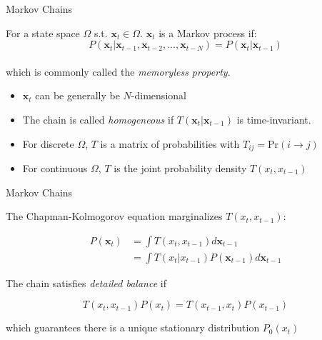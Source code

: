 \documentclass{beamer}					%
\begin{document}
\begin{frame}{Markov Chains}

For a state space $\Omega$ s.t. $\mathbf{x}_t\in \Omega$. $\mathbf{x}_t$ is a Markov process if:\\
\vspace{0.1in}
\begin{equation*}
P(\mathbf{x}_{t}|\mathbf{x}_{t-1},\mathbf{x}_{t-2},...,\mathbf{x}_{t-N}) = P(\mathbf{x}_{t}|\mathbf{x}_{t-1})
\end{equation*}
\\
\vspace{0.1in}
which is commonly called the \emph{memoryless property}.\\
\vspace{0.1in}

\begin{itemize}
\item $\mathbf{x}_{t}$ can be generally be $N$-dimensional
\item The chain is called \emph{homogeneous} if $T(\mathbf{x}_{t}|\mathbf{x}_{t-1})$ is time-invariant.
\item For discrete $\Omega$, $T$ is a matrix of probabilities with $T_{ij} = \mathrm{Pr}(i\rightarrow j)$
\item For continuous $\Omega$, $T$ is the joint probability density $T(x_{t},x_{t-1})$
\end{itemize}

\end{frame}

\begin{frame}{Markov Chains}

The Chapman-Kolmogorov equation marginalizes $T(x_{t},x_{t-1})$:

\begin{align*}
P(\mathbf{x}_t) &= \int T(x_{t},x_{t-1})d\mathbf{x}_{t-1}\\
&= \int T(x_{t}|x_{t-1})P(\mathbf{x}_{t-1})d\mathbf{x}_{t-1}
\end{align*} 

The chain satisfies \emph{detailed balance} if 
 
\begin{equation*}
T(x_{t},x_{t-1})P(x_{t}) = T(x_{t-1},x_{t})P(x_{t-1})
\end{equation*}

\vspace{0.1in}
which guarantees there is a unique stationary distribution $P_{0}(x_{t})$  

\end{frame}
\end{document}
